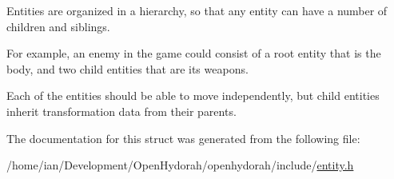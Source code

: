 Entities are organized in a hierarchy, so that any entity can have a number of children and siblings.

For example, an enemy in the game could consist of a root entity that is the body, and two child entities that are its weapons.

Each of the entities should be able to move independently, but child entities inherit transformation data from their parents. 

The documentation for this struct was generated from the following file\-:\begin{DoxyCompactItemize}
\item 
/home/ian/\-Development/\-Open\-Hydorah/openhydorah/include/\hyperlink{entity_8h}{entity.\-h}\end{DoxyCompactItemize}
